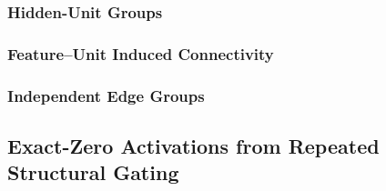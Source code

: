 \documentclass{article}
\begin{document}
\subsubsection{Hidden-Unit Groups}
\label{sec:unit_groups}

%
%
%
%
%
%
%


\subsubsection{Feature--Unit Induced Connectivity}
\label{sec:induced_edges}

%
%
%
%
%
%
%
%
%


\subsubsection{Independent Edge Groups}
\label{sec:edge_groups}

%
%
%
%
%
%



\subsection{Exact-Zero Activations from Repeated Structural Gating}
\label{sec:exact_zero_activation}
\end{document}
